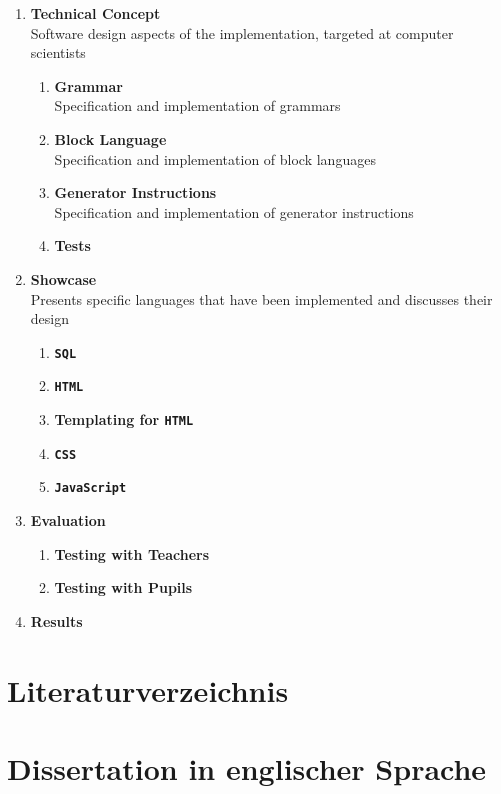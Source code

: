 \documentclass[paper=a4,fontsize=11pt,parskip=half]{scrartcl}
\begin{document}
\begin{enumerate}[noitemsep]
\begin{enumerate}
  \end{enumerate}
\item \textbf{Technical Concept}\\
  Software design aspects of the implementation, targeted at computer scientists
  \begin{enumerate}
  \item \textbf{Grammar}\\
    Specification and implementation of grammars
  \item \textbf{Block Language}\\
    Specification and implementation of block languages
  \item \textbf{Generator Instructions}\\
    Specification and implementation of generator instructions
  \item \textbf{Tests}
  \end{enumerate}
\item \textbf{Showcase}\\
  Presents specific languages that have been implemented and discusses their design
  \begin{enumerate}
  \item \textbf{\texttt{SQL}}
  \item \textbf{\texttt{HTML}}
  \item \textbf{Templating for \texttt{HTML}}
  \item \textbf{\texttt{CSS}}
  \item \textbf{\texttt{JavaScript}}
  \end{enumerate}
\item \textbf{Evaluation}
  \begin{enumerate}
  \item \textbf{Testing with Teachers}
  \item \textbf{Testing with Pupils}
  \end{enumerate}
\item \textbf{Results}
\end{enumerate}

\newpage

\appendix

\section{Literaturverzeichnis}
\printbibliography[heading=none]

\newpage

\section{Dissertation in englischer Sprache}
\end{document}

